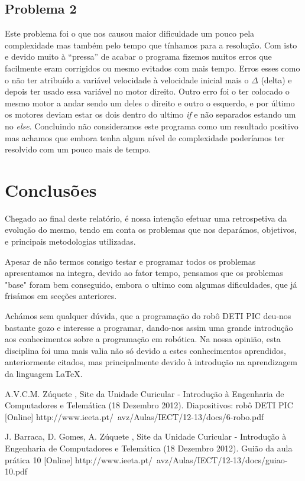 \documentclass[a4paper, 12pt, onecolumn, oneside]{report}
\begin{document}
\subsection{Problema 2}


Este problema foi o que nos causou maior dificuldade um pouco pela complexidade mas também pelo tempo que tínhamos para a resolução. Com isto e devido muito à “pressa” de acabar o programa fizemos muitos erros que facilmente eram corrigidos ou mesmo evitados com mais tempo. Erros esses como o não ter atribuído a variável velocidade à velocidade inicial mais o $\Delta$ (delta) e depois ter usado essa variável no motor direito. Outro erro foi o ter colocado o mesmo motor a andar sendo um deles o direito e outro o esquerdo, e por último os motores deviam estar os dois dentro do ultimo \emph{if} e não separados estando um no \emph{else}.
Concluindo não consideramos este programa como um resultado positivo mas achamos que embora tenha algum nível de complexidade poderíamos ter resolvido com um pouco mais de tempo.



 \newpage

\section{Conclusões}

Chegado ao final deste relatório, é nossa intenção efetuar uma retrospetiva da evolução do mesmo, tendo em conta os problemas que nos deparámos, objetivos, e principais metodologias utilizadas.

Apesar de não termos consigo testar e programar todos os problemas apresentamos na integra, devido ao fator tempo, pensamos que os problemas "base" foram bem conseguido, embora o ultimo com algumas dificuldades, que já frisámos em secções anteriores. 


Achámos sem qualquer dúvida, que a programação do robô DETI PIC deu-nos bastante gozo e interesse a programar, dando-nos assim uma grande introdução aos conhecimentos sobre a programação em robótica. Na nossa opinião, esta disciplina foi uma mais valia não só devido a estes conhecimentos aprendidos, anteriormente citados, mas principalmente devido à introdução na aprendizagem da linguagem \LaTeX.







\begin{thebibliography}{99} 

A.V.C.M. Zúquete , Site da Unidade Curicular - Introdução à Engenharia de Computadores e Telemática (18 Dezembro 2012).
\newblock Diapositivos: robô DETI PIC [Online]
 http://www.ieeta.pt/~avz/Aulas/IECT/12-13/docs/6-robo.pdf 

J. Barraca, D. Gomes, A. Zúquete , Site da Unidade Curicular - Introdução à  Engenharia de Computadores e Telemática (18 Dezembro 2012).
\newblock Guião da aula prática 10 [Online]
 http://www.ieeta.pt/~avz/Aulas/IECT/12-13/docs/guiao-10.pdf 

 
\end{thebibliography}
\end{document}
